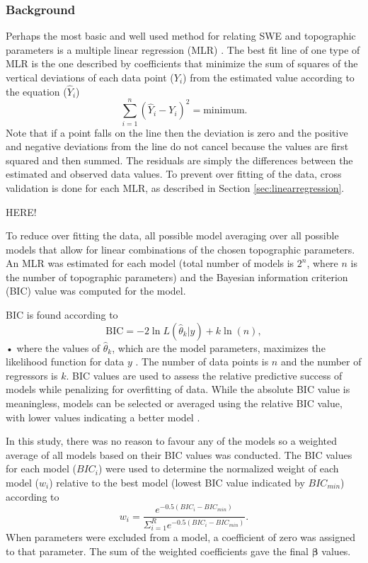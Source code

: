 \documentclass[12pt]{article}
\begin{document}
\subsubsection{Background}

Perhaps the most basic and well used method for relating SWE and topographic parameters is a multiple linear regression (MLR) \citep[e.g.][]{Cohen2013}. The best fit line of one type of MLR is the one described by coefficients that minimize the sum of squares of the vertical deviations of each data point ($Y_i$) from the estimated value according to the equation ($\hat{Y}_i$) \citep{Davis1986}
\begin{equation}
\sum^n_{i=1}(\hat{Y}_i-Y_i)^2 = \mathrm{minimum}.
\end{equation}
Note that if a point falls on the line then the deviation is zero and  the positive and negative deviations from the line do not cancel because the values are first squared and then summed. The residuals are simply the differences between the estimated and observed data values. To prevent over fitting of the data, cross validation is done for each MLR, as described in Section \ref{sec:linearregression}.

HERE!

To reduce over fitting the data, all possible  model averaging over all possible models that allow for linear combinations of the chosen topographic parameters. An MLR was estimated for each model (total number of models is $2^n$, where $n$ is the number of topographic parameters) and the Bayesian information criterion (BIC) value was computed for the model.

BIC is found according to
\begin{equation}
\textrm{BIC} = -2 \ln L(\hat\theta_k  | y) + k \ln(n),
\end{equation}•
where the values of $\hat \theta_k$, which are the model parameters, maximizes the likelihood function for data $y$ \citep{Burnham2004}. The number of data points is $n$ and the number of regressors is $k$. BIC values are used to assess the relative predictive success of models while penalizing for overfitting of data. While the absolute BIC value is meaningless, models can be selected or averaged using the relative BIC value, with lower values indicating a better model \citep{Burnham2004}. 

In this study, there was no reason to favour any of the models so a weighted average of all models based on their BIC values was conducted. The BIC values for each model ($BIC_i$) were used to determine the normalized weight of each model ($w_i$) relative to the best model (lowest BIC value indicated by $BIC_{min}$) according to \citep{Burnham2004}
\begin{equation}
w_i = \frac{e^{-0.5(BIC_i-BIC_{min})}}{\Sigma_{i=1}^R e^{-0.5(BIC_i-BIC_{min})}}.
\label{eq:BIC}
\end{equation}
When parameters were excluded from a model, a coefficient of zero was assigned to that parameter. The sum of the weighted coefficients gave the final $\bm{\beta}$ values.
\end{document}
